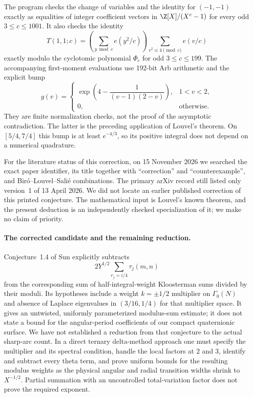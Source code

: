 The program  checks the change of
variables and the identity for $(-1,-1)$ exactly as equalities of integer coefficient vectors in
$\Z[X]/(X^c-1)$ for every odd $3\leq c\leq1001$.
It also checks the identity
\[
 T(1,1;c)=
 \left(\sum_{y\bmod c}e(y^2/c)\right)
 \sum_{v^2\equiv4\pmod c}e(v/c)
\]
exactly modulo the cyclotomic polynomial $\Phi_c$ for odd
$3\leq c\leq199$.
The accompanying first-moment evaluations use 192-bit Arb arithmetic
and the explicit bump
\[
 g(v)=\begin{cases}
 \exp\!\left(4-\dfrac1{(v-1)(2-v)}\right),&1<v<2,\\
 0,&\text{otherwise}.
 \end{cases}
\]
They are finite normalization checks, not the proof of the asymptotic
contradiction.  The latter is the preceding application of Louvel's
theorem.  On $[5/4,7/4]$ this bump is at least $e^{-4/3}$, so its
positive integral does not depend on a numerical quadrature.

For the literature status of this correction, on 15 November 2026 we
searched the exact paper identifier, its title together with
``correction'' and ``counterexample'', and Bir\'o--Louvel--Sali\'e
combinations.  The primary arXiv record still listed only version~1
of 13 April 2026.  We did not locate an earlier published correction
of this printed conjecture.  The mathematical input is Louvel's known
theorem, and the present deduction is an independently checked
specialization of it; we make no claim of priority.

\paragraph{The corrected candidate and the remaining reduction.}
Conjecture~1.4 of Sun \cite{A5Sun2025} explicitly subtracts
\[
 2Y^{1/2}\sum_{r_j=i/4}\tau_j(m,n)
\]
from the corresponding sum of half-integral-weight Kloosterman
sums divided by their moduli.  Its hypotheses include a weight
$k=\pm1/2$ multiplier on $\Gamma_0(N)$ and absence of Laplace
eigenvalues in $(3/16,1/4)$ for that multiplier space.
It gives an untwisted, uniformly parameterized modulus-sum estimate;
it does not state a bound for the angular-period coefficients of
our compact quaternionic surface.
We have not established a reduction from that conjecture to the
actual sharp-arc count.  In a direct ternary delta-method approach
one must specify the multiplier and its spectral condition, handle
the local factors at $2$ and $3$, identify and subtract every theta
term, and prove uniform bounds for the resulting modulus weights
as the physical angular and radial transition widths shrink to
$X^{-1/2}$.  Partial summation with an uncontrolled total-variation
factor does not prove the required exponent.
